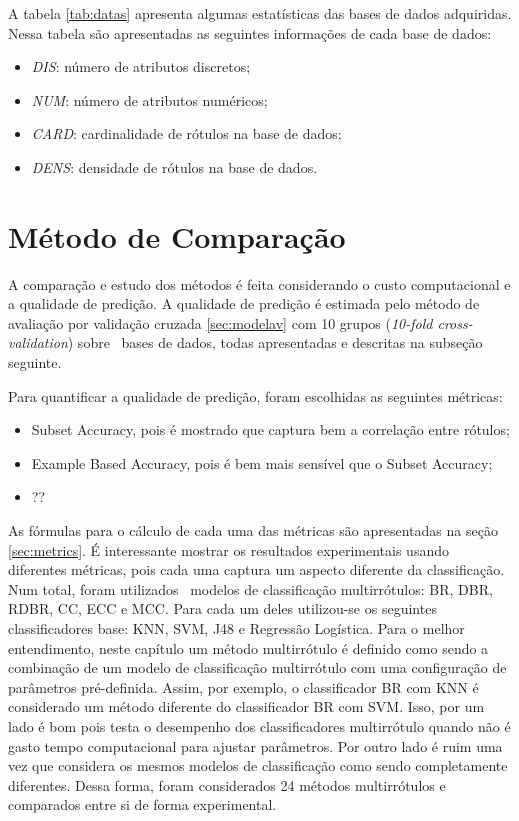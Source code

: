 A tabela \ref{tab:datas} apresenta algumas estatísticas das bases de dados adquiridas.
Nessa tabela são apresentadas as seguintes informações de cada base de dados:
\begin{itemize}
  \item \textit{DIS}: número de atributos discretos;
  \item \textit{NUM}: número de atributos numéricos;
  \item \textit{CARD}: cardinalidade de rótulos na base de dados;
  \item \textit{DENS}: densidade de rótulos na base de dados.
\end{itemize}


\section{Método de Comparação}
\label{sec:methodcomp}
A comparação e estudo dos métodos é feita considerando o custo computacional e a qualidade de predição.
A qualidade de predição é estimada pelo método de avaliação por validação cruzada \ref{sec:modelav} com 10 grupos
(\textit{10-fold cross-validation}) sobre \Nbases~bases de dados, todas apresentadas e descritas na subseção seguinte.


Para quantificar a qualidade de predição, foram escolhidas as seguintes métricas:
\begin{itemize}
 \item Subset Accuracy, pois é mostrado que captura bem a correlação entre rótulos;
 \item Example Based Accuracy, pois é bem mais sensível que o Subset Accuracy;
 \item ??
\end{itemize}

As fórmulas para o cálculo de cada uma das métricas são apresentadas na seção \ref{sec:metrics}.
É interessante mostrar os resultados experimentais usando diferentes métricas, pois cada uma captura
um aspecto diferente da classificação. 
Num total, foram utilizados \Nml~modelos de classificação multirrótulos: BR, DBR, RDBR, CC, ECC e MCC.
Para cada um deles utilizou-se os seguintes classificadores base: KNN, SVM, J48 e Regressão Logística. 
Para o melhor entendimento, neste capítulo um método multirrótulo é definido como sendo a combinação
de um modelo de classificação multirrótulo com uma configuração de parâmetros pré-definida. Assim, por exemplo,
o classificador BR com KNN é considerado um método diferente do classificador BR com SVM. Isso, por um lado é bom
pois testa o desempenho dos classificadores multirrótulo quando não é gasto tempo computacional para ajustar parâmetros.
Por outro lado é ruim uma vez que considera os mesmos modelos de classificação como sendo completamente diferentes.
Dessa forma, foram considerados 24 métodos multirrótulos e comparados entre si de forma experimental.

